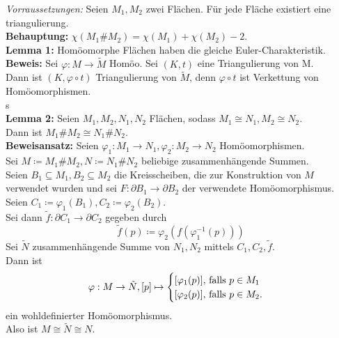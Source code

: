 \begin{problem*}[2]
\emph{Vorraussetzungen: } Seien $ M_1, M_2 $ zwei Flächen. Für jede Fläche existiert eine triangulierung.\\
\textbf{Behauptung:} $ \chi(M_1 \# M_2) = \chi(M_1) + \chi(M_2) - 2$.\\
\textbf{Lemma 1:} Homöomorphe Flächen haben die gleiche Euler-Charakteristik. \\
\textbf{Beweis:} Sei $\varphi : M \to \tilde{ M }$ Homöo. Sei $ (K,t) $ eine Triangulierung von M. \\
Dann ist $ (K,\varphi \circ t) $ Triangulierung von $ \tilde{ M } $, denn $ \varphi \circ t $ ist Verkettung von Homöomorphismen.\\s
\\
\textbf{Lemma 2:} Seien $ M_1, M_2, N_1, N_2 $ Flächen, sodass $ M_1 \cong N_1, M_2 \cong N_2 $.\\
Dann ist $ M_1 \# M_2 \cong N_1 \# N_2$.\\
\textbf{Beweisansatz:} Seien $ \varphi_1: M_1 \to N_1, \varphi_2: M_2 \to N_2 $ Homöomorphismen.\\
Sei $ M \coloneqq M_1 \# M_2 , N \coloneqq N_1 \# N_2$ beliebige zusammenhängende Summen.\\
Seien $ B_1 \subseteq M_1, B_2 \subseteq M_2 $ die Kreisscheiben, die zur Konstruktion von $ M $ verwendet wurden und sei $ F: \partial B_1 \to \partial B_2$ der verwendete Homöomorphismus.\\
Seien $ C_1 \coloneqq \varphi_1 (B_1), C_2 \coloneqq \varphi_2 (B_2)$. \\
Sei dann $ \tilde{ f } : \partial C_1 \to \partial C_2 $ gegeben durch 
\begin{equation*}
  \tilde{ f }(p) \coloneqq \varphi_2 (f(\varphi_1^{ -1 }(p)))
\end{equation*}
Sei $ \tilde{ N } $ zusammenhängende Summe von $ N_1, N_2 $ mittels $ C_1, C_2, \tilde{ f } $.\\
Dann ist
\begin{equation*}
    \varphi: M \to \tilde{ N }, [p] \mapsto \begin{cases}
    [\varphi_1(p)], $ falls $ p \in M_1 \\
    [\varphi_2(p)], $ falls $ p \in M_2. 
      
    \end{cases}
 \end{equation*}
 ein wohldefinierter Homöomorphismus.\\
 Also ist $M \cong \tilde{ N } \cong N$. \\


\end{problem*}
